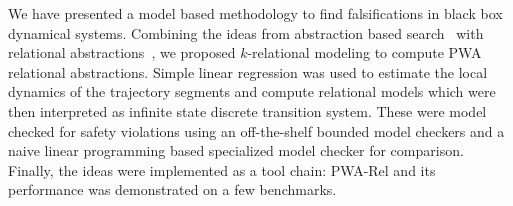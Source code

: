 
We have presented a model based methodology to find falsifications in
black box dynamical systems. Combining the ideas from abstraction
based search~\cite{zutshi2014multiple} with relational
abstractions~\cite{sankaranarayanan2011relational}, we proposed
$k$-relational modeling to compute PWA relational abstractions. Simple
linear regression was used to estimate the local dynamics of the
trajectory segments and compute relational models which were then
interpreted as infinite state discrete transition system. These were
model checked for safety violations using an off-the-shelf bounded
model checkers and a naive linear programming based specialized model
checker for comparison. Finally, the ideas were implemented as a tool
chain: PWA-Rel and its performance was demonstrated on a few
benchmarks.







